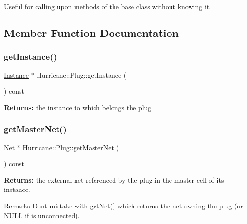 Useful for calling upon methods of the base class without knowing it. 

\subsection{Member Function Documentation}
\mbox{\label{classHurricane_1_1Plug_a6ed1a11f86fbb80afacc9cc31b18a706}} 
\subsubsection{\texorpdfstring{get\+Instance()}{getInstance()}}
{\footnotesize\ttfamily \mbox{\hyperlink{classHurricane_1_1Instance}{Instance}} $\ast$ Hurricane\+::\+Plug\+::get\+Instance (\begin{DoxyParamCaption}{ }\end{DoxyParamCaption}) const\hspace{0.3cm}{\ttfamily [inline]}}

{\bfseries Returns\+:} the instance to which belongs the plug. \mbox{\label{classHurricane_1_1Plug_a57860e49d2674dcef6ea27d79c9d2ad8}} 
\subsubsection{\texorpdfstring{get\+Master\+Net()}{getMasterNet()}}
{\footnotesize\ttfamily \mbox{\hyperlink{classHurricane_1_1Net}{Net}} $\ast$ Hurricane\+::\+Plug\+::get\+Master\+Net (\begin{DoxyParamCaption}{ }\end{DoxyParamCaption}) const\hspace{0.3cm}{\ttfamily [inline]}}

{\bfseries Returns\+:} the external net referenced by the plug in the master cell of its instance.

\begin{DoxyRemark}{Remarks}
Don\textquotesingle{}t mistake with \mbox{\hyperlink{classHurricane_1_1Component_a1556ef77d6b89bfc17698d52ebde9791}{get\+Net()}} which returns the net owning the plug (or N\+U\+LL if is unconnected). 
\end{DoxyRemark}
\mbox{\label{classHurricane_1_1Plug_a51bd5d04a337544709950d7cace05f0d}} 
